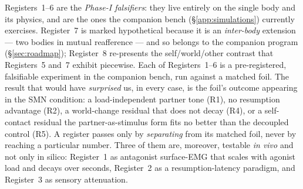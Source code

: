 \documentclass{article}
\begin{document}
Registers~1--6 are the \emph{Phase-I falsifiers}: they live entirely on
the single body and its physics, and are the ones the companion bench
(\S\ref{app:simulations}) currently exercises.  Register~7 is marked
hypothetical because it is an \emph{inter-body} extension --- two bodies
in mutual reafference --- and so belongs to the companion program
(\S\ref{sec:roadmap}); Register~8 re-presents the self/world/other
contrast that Registers~5 and~7 exhibit piecewise.  Each of Registers~1--6
is a pre-registered, falsifiable experiment in the companion bench, run
against a matched foil.  The result that would have \emph{surprised} us,
in every case, is the foil's outcome appearing in the SMN condition: a
load-independent partner tone (R1), no resumption advantage (R2), a
world-change residual that does not decay (R4), or a self-contact residual
the partner-as-stimulus form fits no better than the decoupled control
(R5).  A register passes only by \emph{separating} from its matched foil,
never by reaching a particular number.  Three of them are, moreover,
testable \emph{in vivo} and not only in silico: Register~1 as antagonist
surface-EMG that scales with agonist load and decays over seconds,
Register~2 as a resumption-latency paradigm, and Register~3 as sensory
attenuation.
\end{document}
